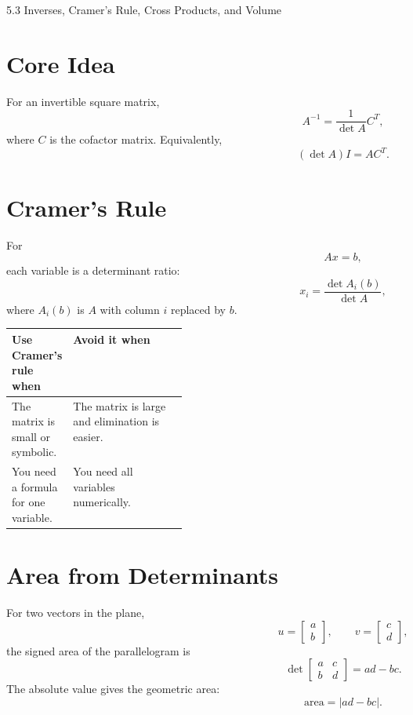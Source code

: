\documentclass[10pt]{article}
\begin{document}
\begin{center}
{\LARGE 5.3 Inverses, Cramer's Rule, Cross Products, and Volume\par}
\end{center}

\section{Core Idea}


For an invertible square matrix,
\[
A^{-1}=\frac{1}{\det A}C^{T},
\]
where \(C\) is the cofactor matrix. Equivalently,
\[
(\det A)I=AC^{T}.
\]

\section{Cramer's Rule}

For
\[
Ax=b,
\]
each variable is a determinant ratio:
\[
x_i=\frac{\det A_i(b)}{\det A},
\]
where \(A_i(b)\) is \(A\) with column \(i\) replaced by \(b\).

\begin{center}
\small
\begin{tabularx}{\linewidth}{@{}L{0.26\linewidth}Y@{}}
\toprule
Use Cramer's rule when & Avoid it when \\
\midrule
The matrix is small or symbolic. & The matrix is large and elimination is easier. \\
You need a formula for one variable. & You need all variables numerically. \\
\bottomrule
\end{tabularx}
\end{center}


\section{Area from Determinants}

For two vectors in the plane,
\[
u=
\begin{bmatrix}
a\\
b
\end{bmatrix},
\qquad
v=
\begin{bmatrix}
c\\
d
\end{bmatrix},
\]
the signed area of the parallelogram is
\[
\det
\begin{bmatrix}
a&c\\
b&d
\end{bmatrix}
=ad-bc.
\]
The absolute value gives the geometric area:
\[
\text{area}=|ad-bc|.
\]
\end{document}
